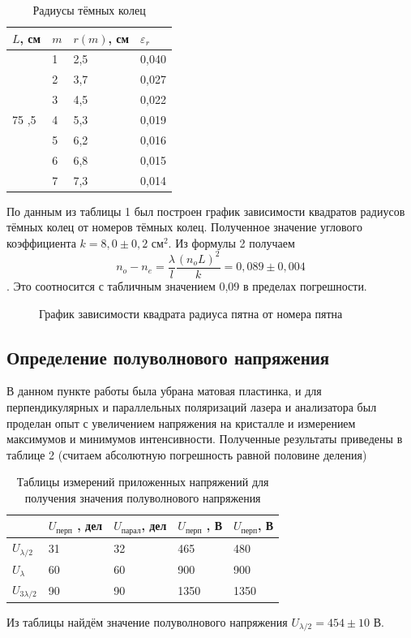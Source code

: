 \documentclass[a4paper,12pt]{article} %
\begin{document}
\begin{table}[H]
    \centering
    \begin{tabular}{|p{2cm}|p{2cm}|p{2cm}|p{2cm}|}
\hline
    $L$, см & $m$ & $r(m)$, см & $\varepsilon_r$ \\  \hline
& 1 & 2,5  & 0,040 \\  \cline{2-4}
& 2 & 3,7  & 0,027 \\  \cline{2-4}
& 3 & 4,5  & 0,022 \\  \cline{2-4}
75 \pm 0,5 & 4 & 5,3  & 0,019 \\  \cline{2-4}
& 5 & 6,2  & 0,016 \\  \cline{2-4}
& 6 & 6,8  & 0,015 \\  \cline{2-4}
& 7 & 7,3  & 0,014 \\  \hline
    \end{tabular}
    \caption{Радиусы тёмных колец}
    \label{radiusy}
\end{table}



По данным из таблицы 1 был построен график зависимости квадратов радиусов тёмных колец от номеров тёмных колец. Полученное значение углового коэффициента $k = 8,0 \pm 0,2 \text{ см}^2$. Из формулы 2 получаем $$n_{o}-n_{e} = \dfrac{\lambda}{l} \dfrac{(n_oL)^2}{k} = 0,089 \pm 0,004$$. Это соотносится с табличным значением 0,09 в пределах погрешности.
\begin{figure}[h]
 \caption{\centering График зависимости квадрата радиуса пятна от номера пятна}
	\label{fig:image1}
\end{figure}
\subsection{Определение полуволнового напряжения}
В данном пункте работы была убрана матовая пластинка, и для перпендикулярных и параллельных поляризаций лазера и анализатора был проделан опыт с увеличением напряжения на кристалле и измерением максимумов и минимумов интенсивности. Полученные результаты приведены в таблице 2 (считаем абсолютную погрешность равной половине деления) 
\begin{table}[h]
\begin{tabular}{|l|l|l|l|l|}
\hline
                 & $U_{\text{перп}}$ , дел & $U_{\text{парал}} $, дел & $U_{\text{перп}}$ , В & $U_{\text{перп}}$, В \\ \hline
$U_{\lambda/2}$  & 31                      & 32                     & 465                     & 480                  \\ \hline
$U_{\lambda}$    & 60                      & 60                     & 900                     & 900                  \\ \hline
$U_{3\lambda/2}$ & 90                      & 90                     & 1350                    & 1350                 \\ \hline
\end{tabular}
\caption{\centering Таблицы измерений приложенных напряжений для получения значения полуволнового напряжения}
\end{table}
Из таблицы найдём значение полуволнового напряжения $U_{\lambda/2} = 454 \pm 10$ В.
\end{document}
